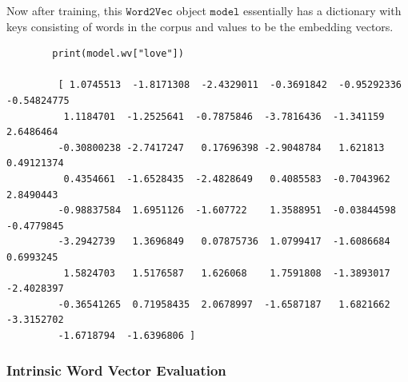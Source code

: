 \documentclass{article}
\begin{document}
      Now after training, this $\texttt{Word2Vec}$ object $\texttt{model}$ essentially has a dictionary with keys consisting of words in the corpus and values to be the embedding vectors. 
      \begin{lstlisting}
        print(model.wv["love"])

         [ 1.0745513  -1.8171308  -2.4329011  -0.3691842  -0.95292336 -0.54824775
          1.1184701  -1.2525641  -0.7875846  -3.7816436  -1.341159    2.6486464
         -0.30800238 -2.7417247   0.17696398 -2.9048784   1.621813    0.49121374
          0.4354661  -1.6528435  -2.4828649   0.4085583  -0.7043962   2.8490443
         -0.98837584  1.6951126  -1.607722    1.3588951  -0.03844598 -0.4779845
         -3.2942739   1.3696849   0.07875736  1.0799417  -1.6086684   0.6993245
          1.5824703   1.5176587   1.626068    1.7591808  -1.3893017  -2.4028397
         -0.36541265  0.71958435  2.0678997  -1.6587187   1.6821662  -3.3152702
         -1.6718794  -1.6396806 ]
      \end{lstlisting}

    \subsubsection{Intrinsic Word Vector Evaluation} 
\end{document}
